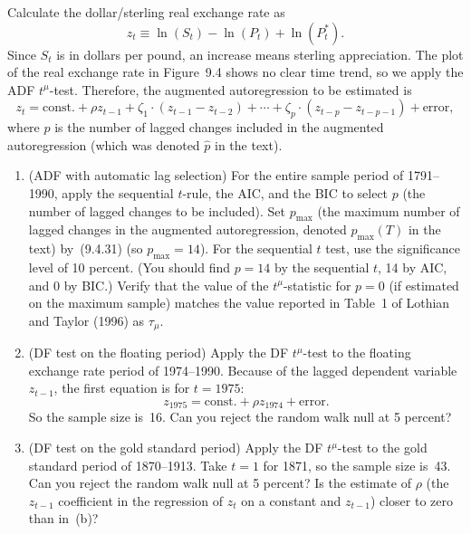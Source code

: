 \begin{problemset}
Calculate the dollar/sterling real exchange rate as
\[
z_t \equiv \ln(S_t) - \ln(P_t) + \ln(P_t^*).
\tag{1}
\]
Since $S_t$ is in dollars per pound, an increase means sterling appreciation. The plot
of the real exchange rate in Figure~9.4 shows no clear time trend, so we apply the
ADF $t^\mu$-test. Therefore, the augmented autoregression to be estimated is
\[
z_t = \text{const.} + \rho z_{t-1} + \zeta_1 \cdot (z_{t-1} - z_{t-2}) + \cdots
+ \zeta_p \cdot (z_{t-p} - z_{t-p-1}) + \text{error},
\tag{2}
\]
where $p$ is the number of lagged changes included in the augmented autoregression
(which was denoted $\hat{p}$ in the text).

\begin{enumerate}[label=(\alph*)]
\item (ADF with automatic lag selection) \enspace For the entire sample period of 1791--1990, apply the sequential $t$-rule, the AIC, and the BIC to select $p$ (the number of lagged changes to be included). Set $p_{\max}$ (the maximum number of
lagged changes in the augmented autoregression, denoted $p_{\max}(T)$ in the text) by~(9.4.31) (so $p_{\max} = 14$). For the sequential $t$ test, use the significance level
of 10 percent. (You should find $p = 14$ by the sequential $t$, 14 by AIC, and 0
by BIC.) Verify that the value of the $t^\mu$-statistic for $p = 0$ (if estimated on the
maximum sample) matches the value reported in Table~1 of Lothian and Taylor
(1996) as $\tau_\mu$.

\item (DF test on the floating period) \enspace Apply the DF $t^\mu$-test to the floating exchange
rate period of 1974--1990. Because of the lagged dependent variable $z_{t-1}$, the
first equation is for $t = 1975$:
\[
z_{1975} = \text{const.} + \rho z_{1974} + \text{error}.
\]
So the sample size is~16. Can you reject the random walk null at 5 percent?

\item (DF test on the gold standard period) \enspace Apply the DF $t^\mu$-test to the gold standard
period of 1870--1913. Take $t = 1$ for 1871, so the sample size is~43. Can you
reject the random walk null at 5 percent? Is the estimate of $\rho$ (the $z_{t-1}$ coefficient in the regression of $z_t$ on a constant and $z_{t-1}$) closer to zero than in~(b)?


\end{enumerate}
\end{problemset}
